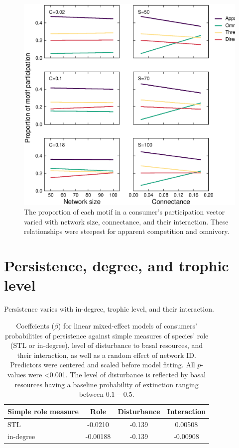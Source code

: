\documentclass[12pt]{article}
\begin{document}
\begin{spacing}{2.0}
    \begin{figure}[ht!]
        \centering
        \includegraphics[height=.4\textheight]{figures/participation_vs_SC.eps}
        \caption{The proportion of each motif in a consumer's participation vector varied with network size, connectance, and their interaction. These relationships were steepest for apparent competition and omnivory.}
        \label{fig:roles_vs_SC}
    \end{figure}
\clearpage 

\section{Persistence, degree, and trophic level}


    Persistence varies with in-degree, trophic level, and their interaction.

    \begin{table}[hb!]
        \caption{Coeffcients ($\beta$) for linear mixed-effect models of consumers' probabilities of persistence against simple measures of species' role (STL or in-degree), level of disturbance to basal resources, and their interaction, as well as a random effect of network ID. Predictors were centered and scaled before model fitting. All $p$-values were \textless0.001. The level of disturbance is reflected by basal resources having a baseline probability of extinction ranging between $0.1 - 0.5$.}
        \label{tab:per_vs_TLdeg}
        \centering
        \begin{tabular}{l|c  c  c |}
            Simple role measure & Role & Disturbance & Interaction \\
            \hline
            STL & -0.0210 & -0.139 & 0.00508 \\
            in-degree & -0.00188 & -0.139 & -0.00908 \\
        \end{tabular}
    \end{table}



\end{spacing}
\end{document}
